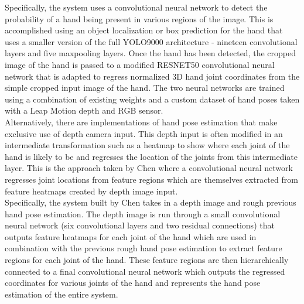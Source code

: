 Specifically, the system uses a convolutional neural network to detect the probability of a hand being present in various regions of the image. This is accomplished using an object localization or box prediction for the hand that uses a smaller version of the full YOLO9000 architecture - nineteen convolutional layers and five maxpooling layers. Once the hand has been detected, the cropped image of the hand is passed to a modified RESNET50 convolutional neural network that is adapted to regress normalized 3D hand joint coordinates from the simple cropped input image of the hand. The two neural networks are trained using a combination of existing weights and a custom dataset of hand poses taken with a Leap Motion depth and RGB sensor. \\

Alternatively, there are implementations of hand pose estimation that make exclusive use of depth camera input. This depth input is often modified in an intermediate transformation such as a heatmap to show where each joint of the hand is likely to be and regresses the location of the joints from this intermediate layer. This is the approach taken by Chen \cite{pose_guided_cnn} where a convolutional neural network regresses joint locations from feature regions which are themselves extracted from feature heatmaps created by depth image input. \\

Specifically, the system built by Chen takes in a depth image and rough previous hand pose estimation. The depth image is run through a small convolutional neural network (six convolutional layers and two residual connections) that outputs feature heatmaps for each joint of the hand which are used in combination with the previous rough hand pose estimation to extract feature regions for each joint of the hand. These feature regions are then hierarchically connected to a final convolutional neural network which outputs the regressed coordinates for various joints of the hand and represents the hand pose estimation of the entire system. \\

